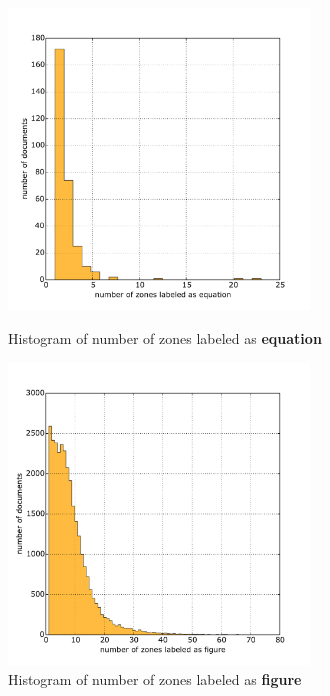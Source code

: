   \begin{figure}
\centering
\begin{minipage}[t!]{0.48\linewidth}
  \includegraphics[width=8cm]{plots/equation_histogram}
  \caption{Histogram of number of zones labeled as \textbf{equation}}
  \label{fig:equation_histogram}
\end{minipage}
\quad
\begin{minipage}[t!]{0.48\linewidth}
  \includegraphics[width=8cm]{plots/figure_histogram}
  \caption{Histogram of number of zones labeled as \textbf{figure}}
  \label{fig:figure_histogram}
\end{minipage}
\end{figure}

